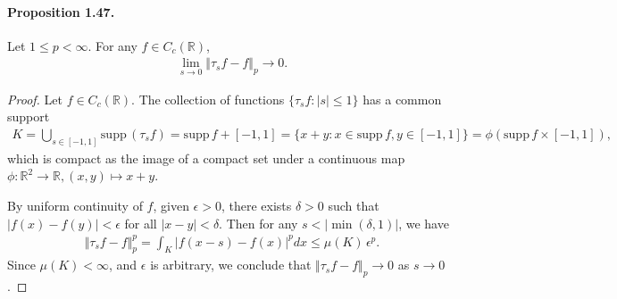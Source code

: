 \documentclass{article}
\newcommand{\supp}{\mathrm{supp}\,}
\begin{document}
\paragraph{Proposition 1.47.\label{prop:1.47}} Let $1\leq p < \infty$. For any $f\in C_c(\mathbb{R})$,
\begin{align*}
	\lim_{s\to 0} \Vert\tau_s f-f\Vert_p \to 0.\tag{1.18}\label{eq:1.18}
\end{align*}
\begin{proof}
Let $f\in C_c(\mathbb{R})$. The collection of functions $\{\tau_s f: \vert s\vert\leq 1\}$ has a common support
\begin{align*}
	K = \bigcup_{s\in[-1,1]}\supp(\tau_s f) = \supp f + [-1,1] = \{x+y:x\in\supp f, y\in[-1,1]\} = \phi(\supp f\times [-1,1]),
\end{align*}
which is compact as the image of a compact set under a continuous map $\phi:\mathbb{R}^2\to\mathbb{R},(x,y)\mapsto x+y$.
\vspace{0.1cm}

By uniform continuity of $f$, given $\epsilon>0$, there exists $\delta > 0$ such that $\vert f(x) - f(y)\vert < \epsilon$ for all $\vert x-y\vert < \delta$. Then for any $s<\vert\min(\delta,1)\vert$, we have
\begin{align*}
	\Vert\tau_s f-f\Vert_p^p = \int_K \vert f(x-s) - f(x)\vert^p dx \leq \mu(K)\,\epsilon^p.
\end{align*}
Since $\mu(K)<\infty$, and $\epsilon$ is arbitrary, we conclude that $\Vert\tau_s f-f\Vert_p\to 0$ as $s\to 0$.
\end{proof}
\end{document}
